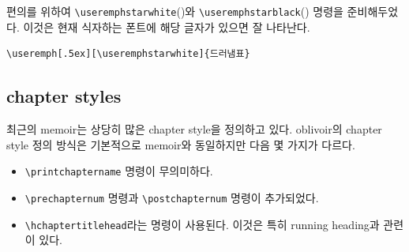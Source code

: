 \documentclass[
	12pt,
	a4paper,
	kosection,
	footnote,
	nobookmarks,
	microtype,
	figtabcapt,
]{oblivoir}
\def\cs#1{\texttt{\textbackslash #1}}
\newcommand\xobclass{x\-ob\-liv\-oir\oblivoirallowbreak}
\newcommand\obclass{ob\-liv\-oir\oblivoirallowbreak}
\def\xetexko{\XeTeX-\ko}
\begin{document}
\medskip

편의를 위하여 \cs{useremphstarwhite}({\useremphstarwhite})와 \cs{useremphstarblack}({\useremphstarblack})
명령을 준비해두었다. 이것은 현재 식자하는 폰트에 해당 글자가 있으면 잘 나타난다.

\medskip

\noindent\begin{minipage}{.7\textwidth}
\begin{verbatim}
\useremph[.5ex][\useremphstarwhite]{드러냄표}
\end{verbatim}
\end{minipage}\hfill
\begin{minipage}{.28\textwidth}
\end{minipage}


\subsection{chapter styles}
최근의 memoir는 상당히 많은 chapter style을 정의하고 있다. oblivoir의 chapter style
정의 방식은 기본적으로 memoir와 동일하지만 다음 몇 가지가 다르다.

\begin{itemize}\tightlist
\item \cs{printchaptername} 명령이 무의미하다.
\item \cs{prechapternum} 명령과 \cs{postchapternum} 명령이 추가되었다.
\item \cs{hchaptertitlehead}라는 명령이 사용된다. 이것은 특히 running heading과 관련이 있다.
\end{itemize}
\end{document}
